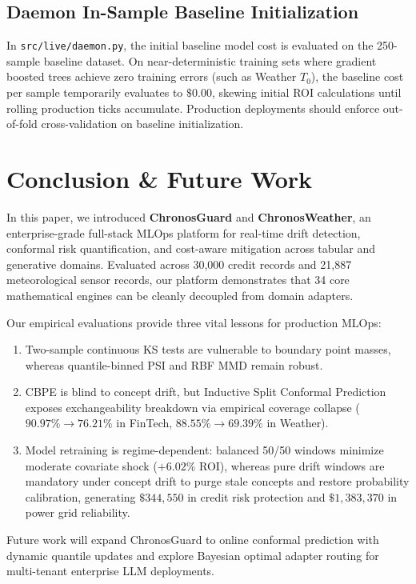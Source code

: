 \documentclass[conference]{IEEEtran}
\begin{document}
\subsection{Daemon In-Sample Baseline Initialization}
In \texttt{src/live/daemon.py}, the initial baseline model cost is evaluated on the 250-sample baseline dataset. On near-deterministic training sets where gradient boosted trees achieve zero training errors (such as Weather $T_0$), the baseline cost per sample temporarily evaluates to $\$0.00$, skewing initial ROI calculations until rolling production ticks accumulate. Production deployments should enforce out-of-fold cross-validation on baseline initialization.

\balance
\section{Conclusion \& Future Work}
In this paper, we introduced \textbf{ChronosGuard} and \textbf{ChronosWeather}, an enterprise-grade full-stack MLOps platform for real-time drift detection, conformal risk quantification, and cost-aware mitigation across tabular and generative domains. Evaluated across 30,000 credit records and 21,887 meteorological sensor records, our platform demonstrates that 34 core mathematical engines can be cleanly decoupled from domain adapters. 

Our empirical evaluations provide three vital lessons for production MLOps:
\begin{enumerate}
    \item Two-sample continuous KS tests are vulnerable to boundary point masses, whereas quantile-binned PSI and RBF MMD remain robust.
    \item CBPE is blind to concept drift, but Inductive Split Conformal Prediction exposes exchangeability breakdown via empirical coverage collapse ($90.97\% \to 76.21\%$ in FinTech, $88.55\% \to 69.39\%$ in Weather).
    \item Model retraining is regime-dependent: balanced 50/50 windows minimize moderate covariate shock ($+6.02\%$ ROI), whereas pure drift windows are mandatory under concept drift to purge stale concepts and restore probability calibration, generating $\$344,550$ in credit risk protection and $\$1,383,370$ in power grid reliability.
\end{enumerate}

Future work will expand ChronosGuard to online conformal prediction with dynamic quantile updates and explore Bayesian optimal adapter routing for multi-tenant enterprise LLM deployments.



\end{document}

